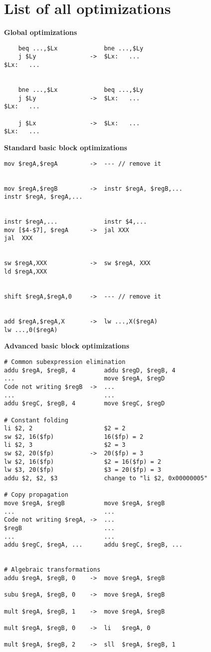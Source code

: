 \documentclass[10pt,a4paper]{article}
\begin{document}
\pagebreak
\appendix

\section{List of all optimizations}

\label{opt}

\textbf{Global optimizations}

\begin{verbatim}
    beq ...,$Lx             bne ...,$Ly
    j $Ly               ->  $Lx:   ...
$Lx:   ...


    bne ...,$Lx             beq ...,$Ly
    j $Ly               ->  $Lx:   ...
$Lx:   ...

    j $Lx               ->  $Lx:   ...
$Lx:   ...
\end{verbatim}
\textbf{Standard basic block optimizations}

\begin{verbatim}
mov $regA,$regA         ->  --- // remove it


mov $regA,$regB         ->  instr $regA, $regB,...
instr $regA, $regA,...


instr $regA,...             instr $4,...
mov [$4-$7], $regA      ->  jal XXX
jal  XXX


sw $regA,XXX            ->  sw $regA, XXX
ld $regA,XXX


shift $regA,$regA,0     ->  --- // remove it


add $regA,$regA,X       ->  lw ...,X($regA)
lw ...,0($regA)
\end{verbatim}
\textbf{Advanced basic block optimizations}

\begin{verbatim}
# Common subexpression elimination
addu $regA, $regB, 4        addu $regD, $regB, 4
...                         move $regA, $regD
Code not writing $regB  ->  ...
...                         ...
addu $regC, $regB, 4        move $regC, $regD

# Constant folding
li $2, 2                    $2 = 2
sw $2, 16($fp)              16($fp) = 2
li $2, 3                    $2 = 3
sw $2, 20($fp)          ->  20($fp) = 3
lw $2, 16($fp)              $2 = 16($fp) = 2
lw $3, 20($fp)              $3 = 20($fp) = 3
addu $2, $2, $3             change to "li $2, 0x00000005"

# Copy propagation
move $regA, $regB           move $regA, $regB
...                         ...
Code not writing $regA, ->  ...
$regB                       ...
...                         ...
addu $regC, $regA, ...      addu $regC, $regB, ...


# Algebraic transformations
addu $regA, $regB, 0    ->  move $regA, $regB

subu $regA, $regB, 0    ->  move $regA, $regB

mult $regA, $regB, 1    ->  move $regA, $regB

mult $regA, $regB, 0    ->  li   $regA, 0

mult $regA, $regB, 2    ->  sll  $regA, $regB, 1
\end{verbatim}
\end{document}
